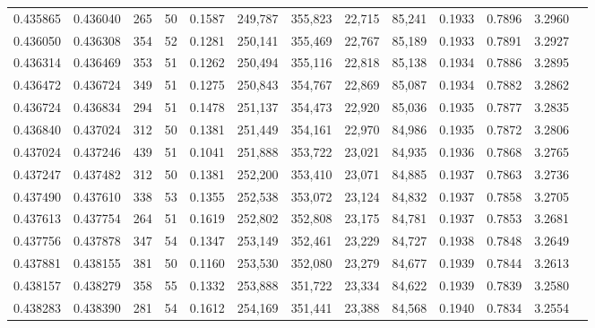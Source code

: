 \begin{tabular}{rrrrrrrrrrrrr}
0.435865 & 0.436040 &   265 &  50 &                                     0.1587 & 249,787 & 355,823 &  22,715 &  85,241 & 0.1933 & 0.7896 & 3.2960 \\
0.436050 & 0.436308 &   354 &  52 &                                     0.1281 & 250,141 & 355,469 &  22,767 &  85,189 & 0.1933 & 0.7891 & 3.2927 \\
0.436314 & 0.436469 &   353 &  51 &                                     0.1262 & 250,494 & 355,116 &  22,818 &  85,138 & 0.1934 & 0.7886 & 3.2895 \\
0.436472 & 0.436724 &   349 &  51 &                                     0.1275 & 250,843 & 354,767 &  22,869 &  85,087 & 0.1934 & 0.7882 & 3.2862 \\
0.436724 & 0.436834 &   294 &  51 &                                     0.1478 & 251,137 & 354,473 &  22,920 &  85,036 & 0.1935 & 0.7877 & 3.2835 \\
0.436840 & 0.437024 &   312 &  50 &                                     0.1381 & 251,449 & 354,161 &  22,970 &  84,986 & 0.1935 & 0.7872 & 3.2806 \\
0.437024 & 0.437246 &   439 &  51 &                                     0.1041 & 251,888 & 353,722 &  23,021 &  84,935 & 0.1936 & 0.7868 & 3.2765 \\
0.437247 & 0.437482 &   312 &  50 &                                     0.1381 & 252,200 & 353,410 &  23,071 &  84,885 & 0.1937 & 0.7863 & 3.2736 \\
0.437490 & 0.437610 &   338 &  53 &                                     0.1355 & 252,538 & 353,072 &  23,124 &  84,832 & 0.1937 & 0.7858 & 3.2705 \\
0.437613 & 0.437754 &   264 &  51 &                                     0.1619 & 252,802 & 352,808 &  23,175 &  84,781 & 0.1937 & 0.7853 & 3.2681 \\
0.437756 & 0.437878 &   347 &  54 &                                     0.1347 & 253,149 & 352,461 &  23,229 &  84,727 & 0.1938 & 0.7848 & 3.2649 \\
0.437881 & 0.438155 &   381 &  50 &                                     0.1160 & 253,530 & 352,080 &  23,279 &  84,677 & 0.1939 & 0.7844 & 3.2613 \\
0.438157 & 0.438279 &   358 &  55 &                                     0.1332 & 253,888 & 351,722 &  23,334 &  84,622 & 0.1939 & 0.7839 & 3.2580 \\
0.438283 & 0.438390 &   281 &  54 &                                     0.1612 & 254,169 & 351,441 &  23,388 &  84,568 & 0.1940 & 0.7834 & 3.2554 \\

\end{tabular}
